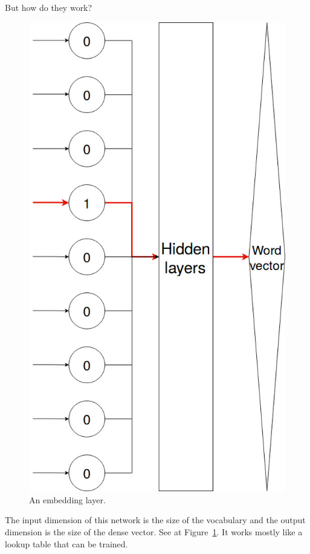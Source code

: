 But how do they work?

\begin{figure}[!htb]
	\centering
	\includegraphics[scale=0.25]{embedding_layer.jpg}
	\caption{An embedding layer.}
	\label{fig:embedding_layer}
\end{figure}

The input dimension of this network is the size of the vocabulary and the output dimension is the size of the dense vector. See at Figure~\ref{fig:embedding_layer}. It works mostly like a lookup table that can be trained.
\FloatBarrier

